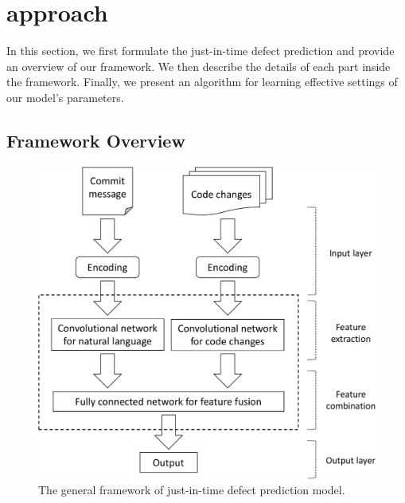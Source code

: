 \section{approach}
\label{sec:approach}
In this section, we first formulate the just-in-time defect prediction and provide an overview of our framework. We then describe the details of each part inside the framework. Finally, we present an algorithm for learning effective settings of our model's parameters. 
\subsection{Framework Overview}
\label{sec:overview}

\begin{figure}
\center
\includegraphics[scale=0.36]{figs/framework.pdf}
\caption{The general framework of just-in-time defect prediction model.}
\label{fig:overview}
\end{figure}


